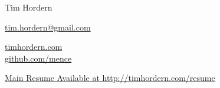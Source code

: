 \documentclass[$fontsize$, a4paper]{article}
\begin{document}
{\LARGE {Tim Hordern}}\\[.2cm]

\begin{multicols}{2}

\vspace{-10pt}

\href{mailto:tim.hordern@gmail.com}{tim.hordern@gmail.com}\\

\columnbreak

\href{http://timhordern.com}{timhordern.com}\\
\href{http://github.com/mence}{github.com/mence}\\
\end{multicols}

\href{http://timhordern.com/resume.pdf}{Main Resume Available at http://timhordern.com/resume}\\[.2cm]
\vspace{-5pt}
\end{document}
